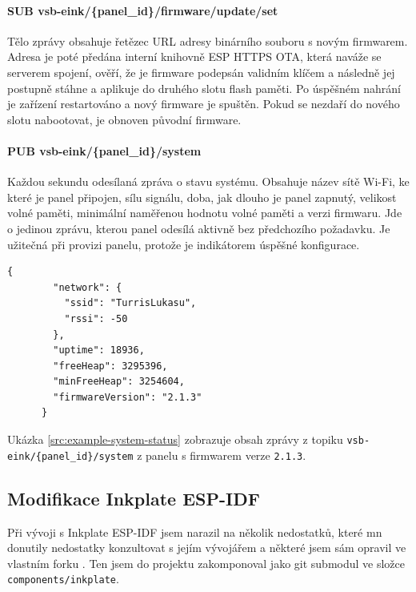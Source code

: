\paragraph*{SUB vsb-eink/\{panel\_id\}/firmware/update/set}
Tělo zprávy obsahuje řetězec URL adresy binárního souboru s novým firmwarem. Adresa je poté předána interní knihovně ESP HTTPS OTA, která naváže se serverem spojení, ověří, že je firmware podepsán validním klíčem a následně jej postupně stáhne a aplikuje do druhého slotu flash paměti. Po úspěšném nahrání je zařízení restartováno a nový firmware je spuštěn. Pokud se nezdaří do nového slotu nabootovat, je obnoven původní firmware.

\paragraph*{PUB vsb-eink/\{panel\_id\}/system}
Každou sekundu odesílaná zpráva o stavu systému. Obsahuje název sítě Wi-Fi, ke které je panel připojen, sílu signálu, doba, jak dlouho je panel zapnutý, velikost volné paměti, minimální naměřenou hodnotu volné paměti a verzi firmwaru. Jde o jedinou zprávu, kterou panel odesílá aktivně bez předchozího požadavku. Je užitečná při provizi panelu, protože je indikátorem úspěšné konfigurace.

\begin{lstlisting}[label=src:example-system-status,caption={Ukázka zprávy stavu systému}]
    {
        "network": {
          "ssid": "TurrisLukasu",
          "rssi": -50
        },
        "uptime": 18936,
        "freeHeap": 3295396,
        "minFreeHeap": 3254604,
        "firmwareVersion": "2.1.3"
      }
\end{lstlisting}

Ukázka \ref{src:example-system-status} zobrazuje obsah zprávy z topiku \lstinline|vsb-eink/{panel_id}/system| z panelu s firmwarem verze \verb|2.1.3|.

\subsection{Modifikace Inkplate ESP-IDF}
Při vývoji s Inkplate ESP-IDF jsem narazil na několik nedostatků, které mn donutily nedostatky konzultovat s jejím vývojářem a některé jsem sám opravil ve vlastním forku \cite{TajnymagESPIDFInkPlateESPIDFInkPlate}. Ten jsem do projektu zakomponoval jako git submodul ve složce \verb|components/inkplate|.

